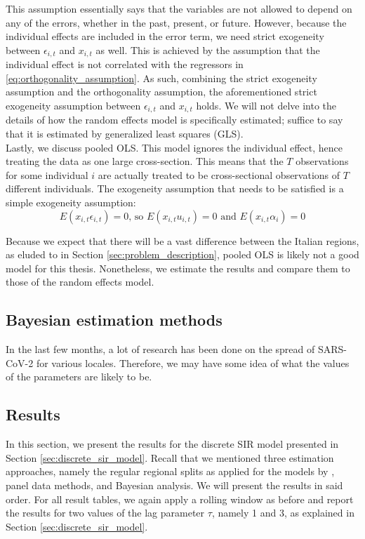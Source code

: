 \documentclass[12pt]{article}
\begin{document}
	This assumption essentially says that the variables are not allowed to depend on any of the errors, whether in the past, present, or future. However, because the individual effects are included in the error term, we need strict exogeneity between $\epsilon_{i,t}$ and $x_{i,t}$ as well. This is achieved by the assumption that the individual effect is not correlated with the regressors in \eqref{eq:orthogonality_assumption}. As such, combining the strict exogeneity assumption and the orthogonality assumption, the aforementioned strict exogeneity assumption between $\epsilon_{i,t}$ and $x_{i,t}$ holds. We will not delve into the details of how the random effects model is specifically estimated; suffice to say that it is estimated by generalized least squares (GLS). \\
	
	Lastly, we discuss pooled OLS. This model ignores the individual effect, hence treating the data as one large cross-section. This means that the $T$ observations for some individual $i$ are actually treated to be cross-sectional observations of $T$ different individuals. The exogeneity assumption that needs to be satisfied is a simple exogeneity assumption:
	    \[E(x_{i,t}\epsilon_{i,t}) = 0 \text{, so } E(x_{i,t}u_{i,t}) = 0 \text{ and } E(x_{i,t}\alpha_i) = 0\]
	
	Because we expect that there will be a vast difference between the Italian regions, as eluded to in Section \ref{sec:problem_description}, pooled OLS is likely not a good model for this thesis. Nonetheless, we estimate the results and compare them to those of the random effects model.
	
	\subsection{Bayesian estimation methods}\label{subsec:discrete_sir_bayesian}
	In the last few months, a lot of research has been done on the spread of SARS-CoV-2 for various locales. Therefore, we may have some idea of what the values of the parameters are likely to be.
	
	\subsection{Results}\label{subsec:results_discrete_sir}
	
	In this section, we present the results for the discrete SIR model presented in Section \ref{sec:discrete_sir_model}. Recall that we mentioned three estimation approaches, namely the regular regional splits as applied for the models by \textcite{adda2016economic}, panel data methods, and Bayesian analysis. We will present the results in said order. For all result tables, we again apply a rolling window as before and report the results for two values of the lag parameter $\tau$, namely 1 and 3, as explained in Section \ref{sec:discrete_sir_model}. \\
	
\end{document}
